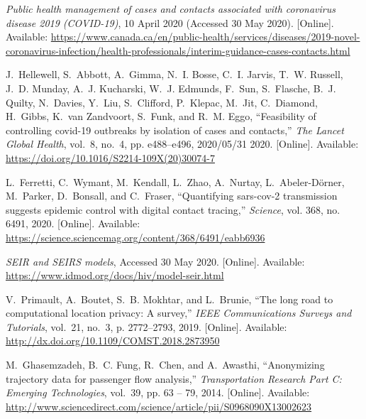 \documentclass[11pt]{article}
\begin{document}
\begin{thebibliography}{10}
\BIBentryALTinterwordspacing
\emph{Public health management of cases and contacts associated with
  coronavirus disease 2019 (COVID-19)}, 10 April 2020 (Accessed 30 May 2020).
  [Online]. Available:
  \url{https://www.canada.ca/en/public-health/services/diseases/2019-novel-coronavirus-infection/health-professionals/interim-guidance-cases-contacts.html}
\BIBentrySTDinterwordspacing

\BIBentryALTinterwordspacing
J.~Hellewell, S.~Abbott, A.~Gimma, N.~I. Bosse, C.~I. Jarvis, T.~W. Russell,
  J.~D. Munday, A.~J. Kucharski, W.~J. Edmunds, F.~Sun, S.~Flasche, B.~J.
  Quilty, N.~Davies, Y.~Liu, S.~Clifford, P.~Klepac, M.~Jit, C.~Diamond,
  H.~Gibbs, K.~van Zandvoort, S.~Funk, and R.~M. Eggo, ``Feasibility of
  controlling covid-19 outbreaks by isolation of cases and contacts,''
  \emph{The Lancet Global Health}, vol.~8, no.~4, pp. e488--e496, 2020/05/31
  2020. [Online]. Available:
  \url{https://doi.org/10.1016/S2214-109X(20)30074-7}
\BIBentrySTDinterwordspacing

\BIBentryALTinterwordspacing
L.~Ferretti, C.~Wymant, M.~Kendall, L.~Zhao, A.~Nurtay, L.~Abeler-D{\"o}rner,
  M.~Parker, D.~Bonsall, and C.~Fraser, ``Quantifying sars-cov-2 transmission
  suggests epidemic control with digital contact tracing,'' \emph{Science},
  vol. 368, no. 6491, 2020. [Online]. Available:
  \url{https://science.sciencemag.org/content/368/6491/eabb6936}
\BIBentrySTDinterwordspacing

\BIBentryALTinterwordspacing
\emph{SEIR and SEIRS models}, Accessed 30 May 2020. [Online]. Available:
  \url{https://www.idmod.org/docs/hiv/model-seir.html}
\BIBentrySTDinterwordspacing

\BIBentryALTinterwordspacing
V.~Primault, A.~Boutet, S.~B. Mokhtar, and L.~Brunie, ``The long road to
  computational location privacy: A survey,'' \emph{IEEE Communications Surveys
  and Tutorials}, vol.~21, no.~3, p. 2772–2793, 2019. [Online]. Available:
  \url{http://dx.doi.org/10.1109/COMST.2018.2873950}
\BIBentrySTDinterwordspacing

\BIBentryALTinterwordspacing
M.~Ghasemzadeh, B.~C. Fung, R.~Chen, and A.~Awasthi, ``Anonymizing trajectory
  data for passenger flow analysis,'' \emph{Transportation Research Part C:
  Emerging Technologies}, vol.~39, pp. 63 -- 79, 2014. [Online]. Available:
  \url{http://www.sciencedirect.com/science/article/pii/S0968090X13002623}
\BIBentrySTDinterwordspacing

\end{thebibliography}
\end{document}
